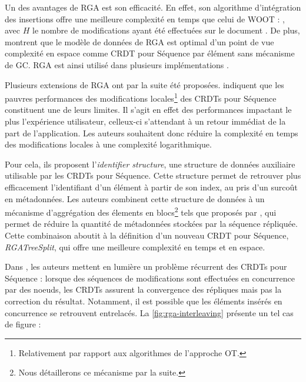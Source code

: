 Un des avantages de \ac{RGA} est son efficacité.
En effet, son algorithme d'intégration des insertions offre une meilleure complexité en temps que celui de WOOT : , avec $H$ le nombre de modifications ayant été effectuées sur le document \cite{2011-evaluation-crdts-ahmed-nacer}.
De plus, \cite{2016-specification-complexity-collaborative-text-editing-attiya,2021-specification-complexity-collaborative-text-editing-attiya} montrent que le modèle de données de \ac{RGA} est optimal d'un point de vue complexité en espace comme \ac{CRDT} pour Séquence par élément sans mécanisme de \ac{GC}.
\ac{RGA} est ainsi utilisé dans plusieurs implémentations \cite{automerge}.

Plusieurs extensions de \ac{RGA} ont par la suite été proposées.
\textcite{briot:hal-01343941} indiquent que les pauvres performances des modifications locales\footnote{Relativement par rapport aux algorithmes de l'approche \ac{OT}.} des \acp{CRDT} pour Séquence constituent une de leurs limites.
Il s'agit en effet des performances impactant le plus l'expérience utilisateur, celleux-ci s'attendant à un retour immédiat de la part de l'application.
Les auteurs souhaitent donc réduire la complexité en temps des modifications locales à une complexité logarithmique.

Pour cela, ils proposent l'\emph{identifier structure}, une structure de données auxiliaire utilisable par les \acp{CRDT} pour Séquence.
Cette structure permet de retrouver plus efficacement l'identifiant d'un élément à partir de son index, au pris d'un surcoût en métadonnées.
Les auteurs combinent cette structure de données à un mécanisme d'aggrégation des élements en blocs\footnote{Nous détaillerons ce mécanisme par la suite.} tels que proposés par \cite{2012-string-wise,2013-logootsplit}, qui permet de réduire la quantité de métadonnées stockées par la séquence répliquée.
Cette combinaison aboutit à la définition d'un nouveau \ac{CRDT} pour Séquence, \emph{RGATreeSplit}, qui offre une meilleure complexité en temps et en espace.

Dans \cite{2019-interleaving-anomalies-collaborative-editors-kleppmann}, les auteurs mettent en lumière un problème récurrent des \acp{CRDT} pour Séquence : lorsque des séquences de modifications sont effectuées en concurrence par des noeuds, les \acp{CRDT} assurent la convergence des répliques mais pas la correction du résultat.
Notamment, il est possible que les éléments insérés en concurrence se retrouvent entrelacés.
La \autoref{fig:rga-interleaving} présente un tel cas de figure :

